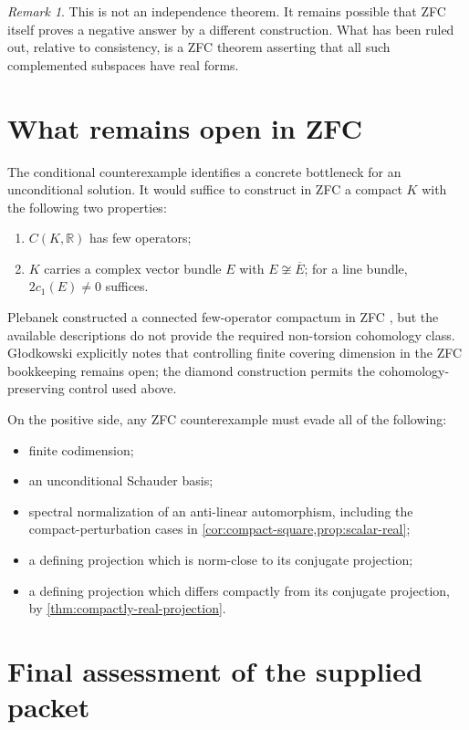 \documentclass[11pt]{article}
\theoremstyle{definition}
\theoremstyle{remark}
\newtheorem{remark}[theorem]{Remark}
\newcommand{\R}{\mathbb R}
\begin{document}
\begin{remark}
This is not an independence theorem. It remains possible that ZFC itself proves a negative answer by a different construction. What has been ruled out, relative to consistency, is a ZFC theorem asserting that all such complemented subspaces have real forms.
\end{remark}

\section{What remains open in ZFC}

The conditional counterexample identifies a concrete bottleneck for an unconditional solution. It would suffice to construct in ZFC a compact $K$ with the following two properties:
\begin{enumerate}[label=(\roman*)]
\item $C(K,\R)$ has few operators;
\item $K$ carries a complex vector bundle $E$ with $E\not\cong\overline E$; for a line bundle, $2c_1(E)\ne0$ suffices.
\end{enumerate}
Plebanek constructed a connected few-operator compactum in ZFC \cite{Plebanek}, but the available descriptions do not provide the required non-torsion cohomology class. G\l odkowski explicitly notes that controlling finite covering dimension in the ZFC bookkeeping remains open; the diamond construction permits the cohomology-preserving control used above.

On the positive side, any ZFC counterexample must evade all of the following:
\begin{itemize}[leftmargin=1.7em]
\item finite codimension;
\item an unconditional Schauder basis;
\item spectral normalization of an anti-linear automorphism, including the compact-perturbation cases in \cref{cor:compact-square,prop:scalar-real};
\item a defining projection which is norm-close to its conjugate projection;
\item a defining projection which differs compactly from its conjugate projection, by \cref{thm:compactly-real-projection}.
\end{itemize}

\section{Final assessment of the supplied packet}
\end{document}
